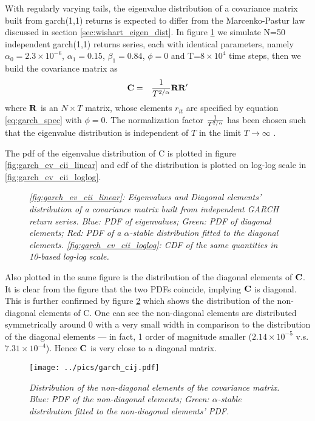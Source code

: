 \documentclass{report}
\begin{document}
With regularly varying tails, the eigenvalue distribution of a
covariance matrix built from \gls{garch}(1,1) returns is expected to
differ from the Marcenko-Pastur law discussed in section
\ref{sec:wishart_eigen_dist}. In figure \ref{fig:garch_ev_cii} we
simulate N=50 independent \gls{garch}(1,1) 
returns series, each with identical parameters, namely $\alpha_0 =
2.3\times 10^{-6}$, $\alpha_1 = 0.15$, $\beta_1 = 0.84$, $\phi = 0$
and T=$8\times10^4$ time steps, then we build the covariance
matrix as
\begin{eqnarray*}
  \mathbf{C} &=& {1 \over T^{2/\alpha}} \mathbf{RR'}
\end{eqnarray*}
where $\mathbf{R}$ is an $N\times T$ matrix, whose elements $r_{it}$ are
specified by equation \ref{eq:garch_spec} with $\phi = 0$. The
normalization factor $1 \over T^{2/\alpha}$ has been chosen such that the
eigenvalue distribution is independent of $T$ in the limit $T \to
\infty$ \cite{politi2010, Cizeau1994}.

The \gls{pdf} of the eigenvalue distribution of C is plotted in figure
\ref{fig:garch_ev_cii_linear} and \gls{cdf} of the distribution is
plotted on log-log scale in \ref{fig:garch_ev_cii_loglog}.
\begin{figure}[htb!]
  \centering
  \caption{\small \it \ref{fig:garch_ev_cii_linear}: Eigenvalues and
    Diagonal elements' distribution of a covariance matrix
    built from independent GARCH return series. Blue: PDF of
    eigenvalues; Green: PDF of diagonal elements; Red: PDF of a
    $\alpha$-stable distribution fitted to the diagonal
    elements. \ref{fig:garch_ev_cii_loglog}: CDF of the same
    quantities in 10-based log-log scale.}
  \label{fig:garch_ev_cii}
\end{figure}
Also plotted in the same figure is the distribution of the diagonal
elements of $\mathbf{C}$. It is clear from the figure that the two PDFs
coincide, implying $\mathbf{C}$ is diagonal. This is further confirmed by
figure \ref{fig:garch_cij} which shows the distribution of the
non-diagonal elements of C. One can see the non-diagonal elements are
distributed symmetrically around 0 with a very small width in
comparison to the distribution of the diagonal elements --- in fact, 1
order of magnitude smaller ($2.14\times10^{-5}$ v.s. $7.31\times
10^{-4}$). Hence $\mathbf{C}$ is very close to a diagonal matrix.
\begin{figure}[htb!]
  \centering
    \texttt{[image: ../pics/garch\_cij.pdf]}
  \caption{\small \it Distribution of the non-diagonal elements of
    the covariance matrix. Blue: PDF of the non-diagonal
    elements; Green: $\alpha$-stable distribution fitted to the
    non-diagonal elements' PDF.}
  \label{fig:garch_cij}
\end{figure}
\end{document}
